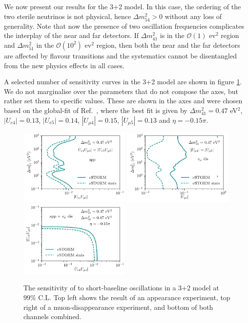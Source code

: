 We now present our results for the 3+2 model. In this case, the ordering of the two sterile neutrinos is not physical, hence $\Delta m^2_{54} > 0 $ without any loss of generality. Note that now the presence of two oscillation frequencies complicates the interplay of the near and far detectors. If $\Delta m^2_{41}$ is in the $\mathcal{O}(1)$ ev$^2$ region and $\Delta m^2_{51}$ in the $\mathcal{O}(10^2)$ ev$^2$ region, then both the near and the far detectors are affected by flavour transitions and the systematics cannot be disentangled from the new physics effects in all cases.

A selected number of sensitivity curves in the 3+2 model are shown in figure \ref{fig:3+2sens_app}. We do not marginalise over the parameters that do not compose the axes, but rather set them to specific values. These are shown in the axes and were chosen based on the global-fit of Ref.~\cite{Collin2016a}, where the best fit is given by $\Delta m^2_{41} = 0.47 $ eV$^2$, $|U_{e4}|=0.13$, $|U_{e5}|=0.14$, $|U_{\mu4}|=0.15$, $|U_{\mu5}|=0.13$ and $\eta=-0.15\pi$.
%
\begin{figure}[t]
\centering
\includegraphics[width=0.49\textwidth]{figs/App_dm_UU.pdf}
\includegraphics[width=0.49\textwidth]{figs/Dis_dm_UU.pdf}\\
\includegraphics[width=0.49\textwidth]{figs/App_dm_UU_UU.pdf}
\caption[The sensitivity of \nus to short-baseline oscillations in a 3+2 model.]{The sensitivity of \nus to short-baseline oscillations in a 3+2 model at $99\%$ C.L. Top left shows the result of an appearance experiment, top right of a muon-disappearance experiment, and bottom of both channels combined.\label{fig:3+2sens_app} }
\end{figure}

